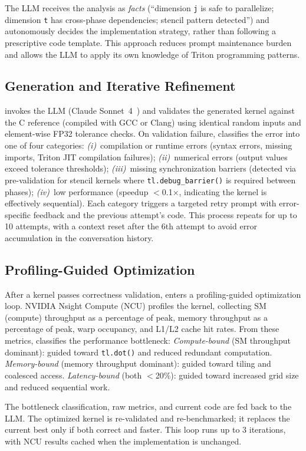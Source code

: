 The LLM receives the analysis as \emph{facts} (``dimension \texttt{j} is safe to parallelize; dimension \texttt{t} has cross-phase dependencies; stencil pattern detected'') and autonomously decides the implementation strategy, rather than following a prescriptive code template. This approach reduces prompt maintenance burden and allows the LLM to apply its own knowledge of Triton programming patterns.

\subsection{Generation and Iterative Refinement}
\sysname invokes the LLM (Claude Sonnet~4~\cite{anthropic2025claude}) and validates the generated kernel against the C reference (compiled with GCC or Clang) using identical random inputs and element-wise FP32 tolerance checks. On validation failure, \sysname classifies the error into one of four categories:
\emph{(i)}~compilation or runtime errors (syntax errors, missing imports, Triton JIT compilation failures);
\emph{(ii)}~numerical errors (output values exceed tolerance thresholds);
\emph{(iii)}~missing synchronization barriers (detected via pre-validation for stencil kernels where \texttt{tl.debug\_barrier()} is required between phases);
\emph{(iv)}~low performance (speedup $<$0.1$\times$, indicating the kernel is effectively sequential).
Each category triggers a targeted retry prompt with error-specific feedback and the previous attempt's code. This process repeats for up to 10 attempts, with a context reset after the 6th attempt to avoid error accumulation in the conversation history.

\subsection{Profiling-Guided Optimization}
\label{sec:profiling}
After a kernel passes correctness validation, \sysname enters a profiling-guided optimization loop. NVIDIA Nsight Compute (NCU) profiles the kernel, collecting SM (compute) throughput as a percentage of peak, memory throughput as a percentage of peak, warp occupancy, and L1/L2 cache hit rates. From these metrics, \sysname classifies the performance bottleneck:
\emph{Compute-bound} (SM throughput dominant): guided toward \texttt{tl.dot()} and reduced redundant computation.
\emph{Memory-bound} (memory throughput dominant): guided toward tiling and coalesced access.
\emph{Latency-bound} (both $<$20\%): guided toward increased grid size and reduced sequential work.

The bottleneck classification, raw metrics, and current code are fed back to the LLM. The optimized kernel is re-validated and re-benchmarked; it replaces the current best only if both correct and faster. This loop runs up to 3 iterations, with NCU results cached when the implementation is unchanged.
